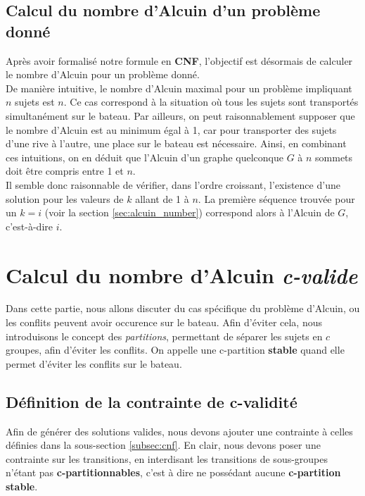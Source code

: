 \documentclass{article}
\begin{document}
\subsection{Calcul du nombre d'Alcuin d'un problème donné}
\label{subsubsec:calcul_alcuin}

\noindent Après avoir formalisé notre formule en \textbf{CNF}, l'objectif est désormais de calculer le nombre d'Alcuin pour un problème donné. \\

\noindent De manière intuitive, le nombre d'Alcuin maximal pour un problème impliquant \( n \) sujets est \( n \). Ce cas correspond à la situation où tous les sujets sont transportés simultanément sur le bateau. Par ailleurs, on peut raisonnablement supposer que le nombre d'Alcuin est au minimum égal à 1, car pour transporter des sujets d'une rive à l'autre, une place sur le bateau est nécessaire. Ainsi, en combinant ces intuitions, on en déduit que l'Alcuin d'un graphe quelconque \( G \) à \( n \) sommets doit être compris entre 1 et \( n \). \\

\noindent Il semble donc raisonnable de vérifier, dans l'ordre croissant, l'existence d'une solution pour les valeurs de \( k \) allant de 1 à \( n \). La première séquence trouvée pour un \( k = i \) (voir la section \ref{sec:alcuin_number}) correspond alors à l'Alcuin de \( G \), c'est-à-dire \( i \).

\section{Calcul du nombre d'Alcuin \textit{c-valide}}
\label{sec:cvalid}

\noindent Dans cette partie, nous allons discuter du cas spécifique du problème d'Alcuin, ou les conflits peuvent avoir occurence sur le bateau. Afin d'éviter cela, nous introduisons le concept des \textit{partitions}, permettant de séparer les sujets en $c$ groupes, afin d'éviter les conflits. On appelle une c-partition \textbf{stable} quand elle permet d'éviter les conflits sur le bateau.

\subsection{Définition de la contrainte de c-validité}

\noindent Afin de générer des solutions valides, nous devons ajouter une contrainte à celles définies dans la sous-section \ref{subsec:cnf}. En clair, nous devons poser une contrainte sur les transitions, en interdisant les transitions de sous-groupes n'étant pas \textbf{c-partitionnables}, c'est à dire ne possédant aucune \textbf{c-partition stable}. \\
\end{document}
